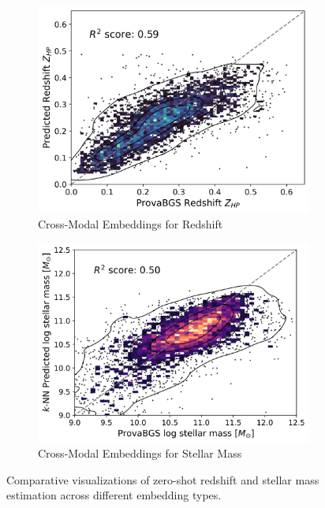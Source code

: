 \documentclass[a4paper,12pt]{article}
\begin{document}
\begin{figure}[H]
    \begin{subfigure}[b]{0.48\textwidth}
        \centering
        \includegraphics[width=\textwidth]{../figures/zeroshot_redshift_crossmodal.png}
        \caption{Cross-Modal Embeddings for Redshift}
        \label{fig:redshift_crossmodal}
    \end{subfigure}%
    \hfill
    \begin{subfigure}[b]{0.48\textwidth}
        \centering
        \includegraphics[width=\textwidth]{../figures/zeroshot_stellarmass_crossmodal.png}
        \caption{Cross-Modal Embeddings for Stellar Mass}
        \label{fig:stellarmass_crossmodal}
    \end{subfigure}

    \caption{Comparative visualizations of zero-shot redshift and stellar mass estimation across different embedding types.}
    \label{fig:comparative_embeddings}
\end{figure}













\newpage


\end{document}

